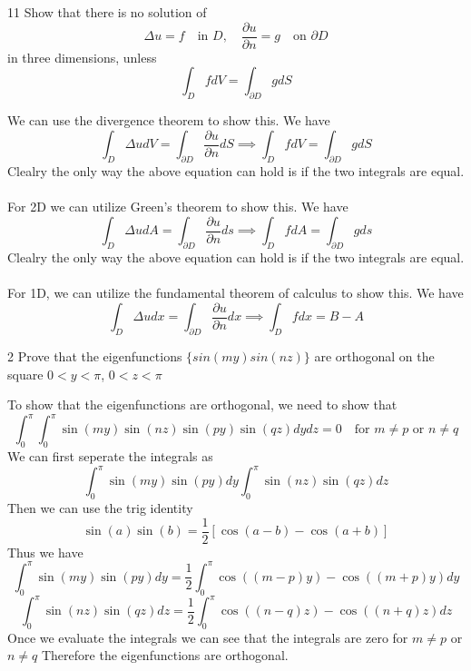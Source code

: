 \documentclass[answers,12pt,addpoints]{exam}
\begin{document}
\begin{questions}
\begin{solution}
    \end{solution}
     11
    Show that there is no solution of 
    $$ \Delta u = f \quad \text{in } D , \quad \frac{\partial u}{\partial n} = g \quad \text{on } \partial D$$
    in three dimensions, unless 
    $$ \int_{D} f dV = \int_{\partial D} g dS$$
    \begin{solution}
        We can use the divergence theorem to show this. We have
        $$ \int_{D} \Delta u dV = \int_{\partial D} \frac{\partial u}{\partial n} dS \implies \int_{D} f dV = \int_{\partial D} g dS$$
        Clealry the only way the above equation can hold is if the two integrals are equal. \\\\
        For 2D we can utilize Green's theorem to show this. We have
        $$ \int_{D} \Delta u dA = \int_{\partial D} \frac{\partial u}{\partial n} ds \implies \int_{D} f dA = \int_{\partial D} g ds$$
        Clealry the only way the above equation can hold is if the two integrals are equal.\\\\
        For 1D, we can utilize the fundamental theorem of calculus to show this. We have
        $$ \int_{D} \Delta u dx = \int_{\partial D} \frac{\partial u}{\partial n} dx \implies \int_{D} f dx = B - A$$
    \end{solution}
     2
    Prove that the eigenfunctions $\{sin(my) sin(nz) \}$ are orthogonal on the square $0 < y < \pi$, $0 < z < \pi$ 
    \begin{solution}
        To show that the eigenfunctions are orthogonal, we need to show that
        $$ \int_{0}^{\pi} \int_{0}^{\pi} \sin(my) \sin(nz)  \sin(py) \sin(qz) dy dz = 0 \quad \text{for } m \neq p \text{ or } n \neq q$$
        We can first seperate the integrals as
        $$ \int_{0}^{\pi} \sin(my) \sin(py) dy \int_{0}^{\pi} \sin(nz) \sin(qz) dz$$
        Then we can use the trig identity
        $$ \sin(a) \sin(b) = \frac{1}{2} \left[ \cos(a-b) - \cos(a+b) \right]$$
        Thus we have
        $$ \int_{0}^{\pi} \sin(my) \sin(py) dy = \frac{1}{2} \int_{0}^{\pi} \cos((m-p)y) - \cos((m+p)y) dy$$
        $$ \int_{0}^{\pi} \sin(nz) \sin(qz) dz = \frac{1}{2} \int_{0}^{\pi} \cos((n-q)z) - \cos((n+q)z) dz$$
        Once we evaluate the integrals we can see that the integrals are zero for $m \neq p$ or $n \neq q$
        Therefore the eigenfunctions are orthogonal.
    \end{solution}
\end{questions}
\end{document}
